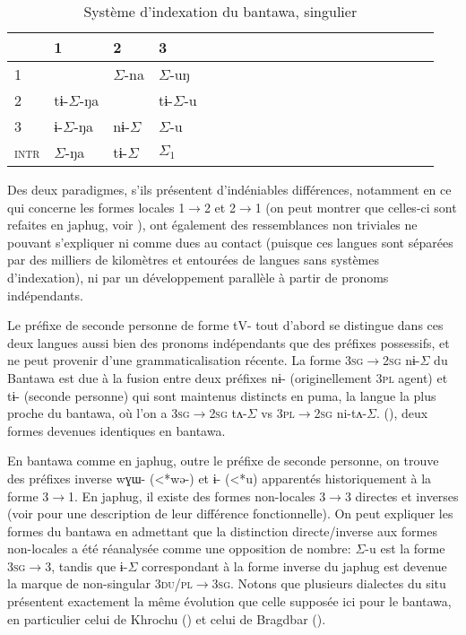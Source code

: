\documentclass[oldfontcommands,oneside,a4paper,11pt]{article}
\newcommand{\ipa}[1]{{\phon \mbox{#1}}} %
\newcommand{\grise}[1]{\cellcolor{lightgray}\textbf{#1}}
\newcommand{\ra}{$\Sigma_1$}
\newcommand{\ro}{$\Sigma$}
\begin{document}
\begin{table}[H]
\caption{Système d'indexation du bantawa, singulier} \centering \label{tab:bantawa}
\begin{tabular}{l|lllllllllllllllllll}
\toprule
&1 & 2 &3 &\\
\midrule
1 &\grise{}& \ro{}-\ipa{na} & \ro{}-\ipa{uŋ}	 \\
2 &\ipa{tɨ-}\ro{}-\ipa{ŋa} &\grise{} &\ipa{tɨ-}\ro{}-\ipa{u}\\
3 &\ipa{ɨ-}\ro{}-\ipa{ŋa}&\ipa{nɨ-}\ro{}& \ro{}-\ipa{u}\\
\midrule
\textsc{intr} & \ro{}-\ipa{ŋa}&\ipa{tɨ-}\ro{}&\ra{} \\
\bottomrule
\end{tabular}
\end{table}

Des deux paradigmes, s'ils présentent d'indéniables différences, notamment en ce qui concerne les formes locales 1$\rightarrow$2 et 2$\rightarrow$1 (on peut montrer que celles-ci sont refaites en japhug, voir \citealt{jacques15generic}), ont également des ressemblances non triviales ne pouvant s'expliquer ni comme dues au contact (puisque ces langues sont séparées par des milliers de kilomètres et entourées de langues sans systèmes d'indexation), ni par un développement parallèle à partir de pronoms indépendants.

Le préfixe de seconde personne de forme \ipa{tV-} tout d'abord se distingue dans ces deux langues aussi bien des pronoms indépendants que des préfixes possessifs, et ne peut provenir d'une grammaticalisation récente. La forme \textsc{3sg$\rightarrow$2sg} \ipa{nɨ-}\ro{} du Bantawa est due à la fusion entre deux préfixes \ipa{nɨ-} (originellement \textsc{3pl} agent)  et \ipa{tɨ-} (seconde personne) qui sont maintenus distincts en puma, la langue la plus proche du bantawa, où l'on a \textsc{3sg$\rightarrow$2sg} \ipa{tʌ-}\ro{} vs \textsc{3pl$\rightarrow$2sg} \ipa{ni-tʌ-}\ro{}. (\citealt{bickel07puma}), deux formes devenues identiques en bantawa.

En bantawa comme en japhug, outre le préfixe de seconde personne, on trouve des préfixes  inverse \ipa{wɣɯ-} (<*\ipa{wə-}) et \ipa{ɨ-} (<*\ipa{u}) apparentés historiquement à la forme \textsc{3$\rightarrow$1}. En japhug, il existe des formes non-locales 3$\rightarrow$3 directes et inverses (voir  \citealt{jacques10inverse} pour une description de leur différence fonctionnelle). On peut expliquer les formes du bantawa en admettant que la distinction directe/inverse aux formes non-locales a été réanalysée comme une opposition de nombre:  \ro{}-\ipa{u} est la forme \textsc{3sg$\rightarrow$3}, tandis que  \ipa{ɨ-}\ro{} correspondant à la forme inverse du japhug est devenue la marque de non-singular \textsc{3du/pl$\rightarrow$3sg}. Notons que plusieurs dialectes du situ présentent exactement la même évolution que celle supposée ici pour le bantawa, en particulier celui de Khrochu (\citealt{jackson15sastod}) et celui de Bragdbar (\citealt{zhangsy17obviative}).
\end{document}
